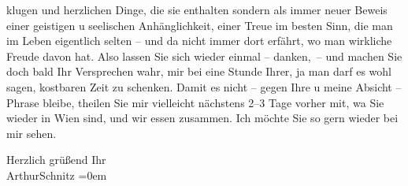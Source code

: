                klugen und herzlichen Dinge, die sie enthalten sondern als immer neuer Beweis einer
               geistigen u seelischen Anhänglichkeit, einer Treue im besten Sinn, die man im Leben
               eigentlich selten – und da{\geminationn} nicht immer dort erfährt, wo man wirkliche Freude davon
               hat. Also lassen Sie sich wieder einmal – danken, – und machen Sie doch bald Ihr
               Versprechen wahr, mir bei \label{K_L03742-1v}\label{K_L03742-1} eine Stunde Ihrer, ja man darf es wohl
               sagen, kostbaren Zeit zu schenken. {\pb}Damit es nicht – gegen
               Ihre u meine Absicht – Phrase bleibe, theilen Sie
               mir vielleicht nächstens 2–3 Tage vorher mit, wa{\geminationn} Sie wieder in Wien sind, und wir essen zusammen. Ich möchte Sie so gern wieder
               bei mir sehen.\pend
           
\pstart
           Herzlich grüßend Ihr{\\[\baselineskip]}\spacefill\mbox{ArthurSchnitz}\pend
           \leftskip=0em{}\endnumbering{}  \newcommand{\dateiname}{L03742}\newcommand{\titel}{Arthur Schnitzler an Stefan Zweig, 16. 5. 1928}\newcommand{\editorInnen}{Selma Jahnke und Martin Anton Müller}
